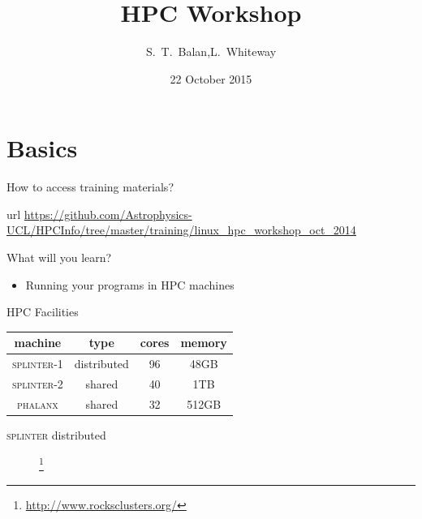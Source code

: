 \documentclass{beamer}
\title[HPC Workshop] %
{HPC Workshop}
\author[Balan,Whiteway] %
{S.~T.~Balan,L.~Whiteway}
\institute[UCL]
{
  Department of Physics and Astronomy\\
  University College London
}
\date[HPC 2015]
{22 October 2015}
\begin{document}
\frame{\titlepage}

\section{Basics}

\begin{frame}{How to access training materials?}
  \begin{block}{url}
    \url{https://github.com/Astrophysics-UCL/HPCInfo/tree/master/training/linux_hpc_workshop_oct_2014}
  \end{block}
\end{frame}


\begin{frame}{What will you learn?}
  \begin{itemize}
    \item Running your programs in HPC machines
  \end{itemize}
\end{frame}


\begin{frame}{HPC Facilities}
  \begin{table}
    \begin{tabular}{|c|c|c|c|}
      \hline
      machine & type & cores & memory  \\
      \hline
      \textsc{splinter}-1 & distributed & 96 & 48GB  \\
      \textsc{splinter}-2 & shared & 40 & 1TB \\
      \textsc{phalanx} & shared & 32 & 512GB \\
      \hline
    \end{tabular}
  \end{table}
\end{frame}

\begin{frame}{\textsc{splinter} distributed}
  \begin{figure}
    \begin{center}
      \footnote{\url{http://www.rocksclusters.org/}}
    \end{center}
  \end{figure}
\end{frame}
\end{document}
